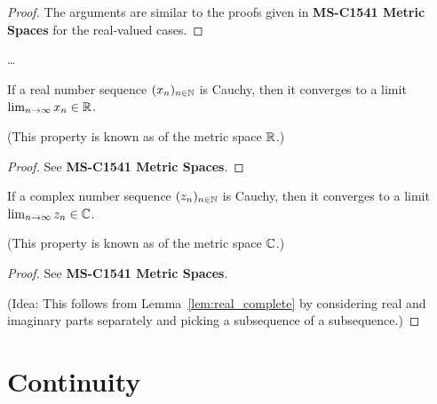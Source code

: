 \begin{proof}
  The arguments are similar to the proofs given in
  \textbf{MS-C1541 Metric Spaces} for the real-valued cases.
\end{proof}

\begin{definition}
  \label{def:cauchy_sequence}
  \ldots
\end{definition}

\begin{lemma}
  \label{lem:real_complete}
  If a real number sequence $(x_n)_{n \in \mathbb{N}}$ is Cauchy,
  then it converges to a limit $\lim_{n \to \infty} x_n \in \mathbb{R}$.

  (This property is known as  of the metric space $\mathbb{R}$.)
\end{lemma}
\begin{proof}
  See \textbf{MS-C1541 Metric Spaces}.
\end{proof}

\begin{lemma}
  \label{lem:complex_complete}
  If a complex number sequence $(z_n)_{n \in \mathbb{N}}$ is Cauchy,
  then it converges to a limit $\lim_{n \to \infty} z_n \in \mathbb{C}$.

  (This property is known as  of the metric space $\mathbb{C}$.)
\end{lemma}
\begin{proof}
  See \textbf{MS-C1541 Metric Spaces}.

  (Idea: This follows from Lemma~\ref{lem:real_complete} by
  considering real and imaginary parts separately and picking
  a subsequence of a subsequence.)
\end{proof}



\section{Continuity}

